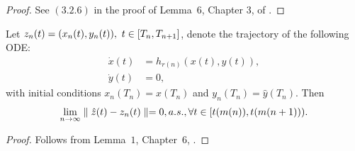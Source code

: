 \begin{proof}
See $(3.2.6)$ in the proof of Lemma~$6$, Chapter $3$, of \cite{SA}. 
\end{proof}
\begin{lemma}\label{scaleconv}
Let $z_n(t)=(x_n(t),y_n(t)), \mbox{ } t\in [T_n,T_{n+1}]$, denote the trajectory of the following ODE:
\begin{subequations}\label{xyodes}
\begin{align}
\label{hfodex} \dot{x}(t)&=h_{r(n)}(x(t),y(t)),\\
\label{hfodey}\dot{y}(t)&=0,
\end{align}
\end{subequations}
with initial conditions $x_n(T_n)=\hat{x}(T_n)$ and $y_n(T_n)=\hat{y}(T_n)$. Then
\begin{align}
\underset{n\rightarrow \infty}{\lim} \parallel \hat{z}(t)-z_n(t)\parallel =0, a.s., \forall t\in [t(m(n)),t(m(n+1))).
\end{align}
\end{lemma}
\begin{proof}
Follows from Lemma~$1$, Chapter~$6$, \cite{SA}.
\end{proof}

